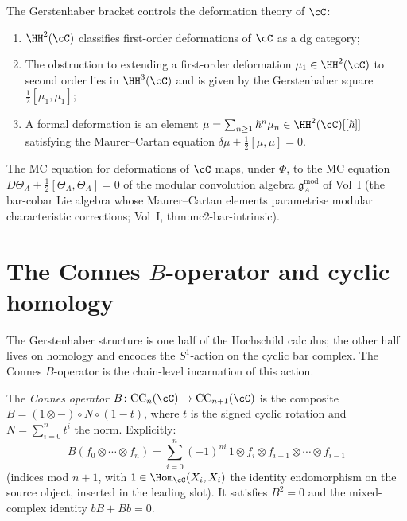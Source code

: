 \begin{proposition}
\label{prop:gerstenhaber-deformations}
The Gerstenhaber bracket controls the deformation theory of
$\cC$:
\begin{enumerate}[label=(\roman*)]
 \item $\HH^2(\cC)$ classifies first-order deformations of
 $\cC$ as a dg category;
 \item The obstruction to extending a first-order deformation
 $\mu_1 \in \HH^2(\cC)$ to second order lies in $\HH^3(\cC)$
 and is given by the Gerstenhaber square
 $\frac{1}{2}[\mu_1, \mu_1]$;
 \item A formal deformation is an element
 $\mu = \sum_{n \geq 1} \hbar^n \mu_n \in \HH^2(\cC)[[\hbar]]$
 satisfying the Maurer--Cartan equation
 $\delta \mu + \frac{1}{2}[\mu, \mu] = 0$.
\end{enumerate}
The MC equation for deformations of $\cC$ maps, under $\Phi$, to
the MC equation $D\Theta_A + \frac{1}{2}[\Theta_A, \Theta_A] = 0$
of the modular convolution algebra $\mathfrak{g}^{\mathrm{mod}}_A$ of Vol~I (the bar-cobar Lie algebra whose Maurer--Cartan elements parametrise modular characteristic corrections; Vol~I, thm:mc2-bar-intrinsic).
\end{proposition}


\section{The Connes \texorpdfstring{$B$}{B}-operator and cyclic homology}
\label{sec:connes-b}

The Gerstenhaber structure is one half of the Hochschild calculus; the other half lives on homology and encodes the $S^1$-action on the cyclic bar complex. The Connes $B$-operator is the chain-level incarnation of this action.

\begin{definition}
\label{def:connes-b}
The \emph{Connes operator}
$B \colon \mathrm{CC}_n(\cC) \to \mathrm{CC}_{n+1}(\cC)$ is the composite $B = (1 \otimes -) \circ N \circ (1 - t)$, where $t$ is the signed cyclic rotation and $N = \sum_{i=0}^n t^i$ the norm. Explicitly:
\[
 B(f_0 \otimes \cdots \otimes f_n)
 = \sum_{i=0}^{n} (-1)^{ni}\,
 1 \otimes f_i \otimes f_{i+1} \otimes \cdots
 \otimes f_{i-1}
\]
(indices mod $n+1$, with $1 \in \Hom_\cC(X_i, X_i)$ the identity endomorphism on the source object, inserted in the leading slot). It satisfies $B^2 = 0$ and the mixed-complex identity $bB + Bb = 0$.
\end{definition}

